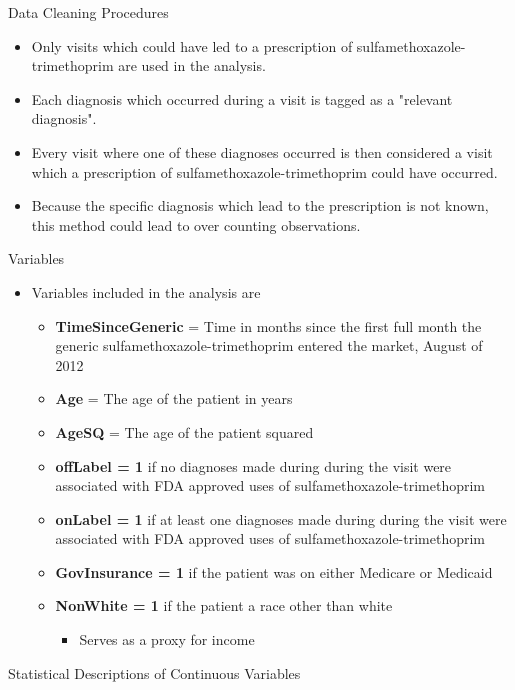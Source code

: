 \documentclass{beamer}
\begin{document}
\begin{frame}{Data Cleaning Procedures}
\begin{itemize}
\item Only visits which could have led to a prescription of sulfamethoxazole-trimethoprim are used in the analysis.
\item Each diagnosis which occurred during a visit is tagged as a "relevant diagnosis".
\item Every visit where one of these diagnoses occurred is then considered a visit which a prescription of sulfamethoxazole-trimethoprim could have occurred.
\item Because the specific diagnosis which lead to the prescription is not known, this method could lead to over counting observations.
\end{itemize}
\end{frame}

\begin{frame}{Variables}
\begin{itemize}
\item Variables included in the analysis are
\begin{itemize}
  \item \textbf{TimeSinceGeneric} = Time in months since the first full month the generic sulfamethoxazole-trimethoprim entered the market, August of 2012
  \item \textbf{Age} = The age of the patient in years
  \item \textbf{AgeSQ} = The age of the patient squared
  \item \textbf{offLabel = 1} if no diagnoses made during during the visit were associated with FDA approved uses of sulfamethoxazole-trimethoprim
  \item \textbf{onLabel = 1} if at least one diagnoses made during during the visit were associated with FDA approved uses of sulfamethoxazole-trimethoprim
  \item \textbf{GovInsurance = 1} if the patient was on either Medicare or Medicaid
  \item \textbf{NonWhite = 1} if the patient a race other than white
  \begin{itemize}
  \item Serves as a proxy for income
  \end{itemize}
\end{itemize}
\end{itemize}
\end{frame}

\begin{frame}{Statistical Descriptions of Continuous Variables}
\scalebox{.475}{}
\end{frame}
\end{document}
